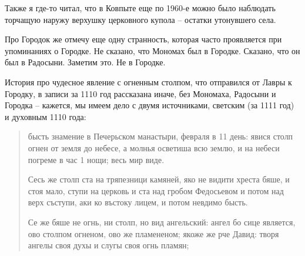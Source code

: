 Также я где-то читал, что в Ковпыте еще по 1960-е можно было наблюдать торчащую наружу верхушку церковного купола – остатки утонувшего села.

Про Городок же отмечу еще одну странность, которая часто проявляется при упоминаниях о Городке. Не сказано, что Мономах был в Городке. Сказано, что он был в Радосыни. Заметим это. Не в Городке.

История про чудесное явление с огненным столпом, что отправился от Лавры к Городку, в записи за 1110 год рассказана иначе, без Мономаха, Радосыни и Городка – кажется, мы имеем дело с двумя источниками, светским (за 1111 год) и духовным 1110 года:

\begin{quotation}
бысть знамение в Печерьском манастыри, февраля в 11 день: явися столп огнен от земля до небесе, а молнья осветиша всю землю, и на небеси погреме в час 1 нощи; весь мир виде. 

Сесь же столп ста на тряпезници камяней, яко не видити хреста бяше, и стоя мало, ступи на церковь и ста над гробом Федосьевом и потом над верх съступи, аки ко въстоку лицем, и потом невдимо бысть.

Се же бяше не огнь, ни столп, но вид ангельский: ангел бо сице является, ово столпом огненом, ово же пламененом; якоже же рче Давид: творя ангелы своя духы и слугы своя огнь пламян;
\end{quotation}
